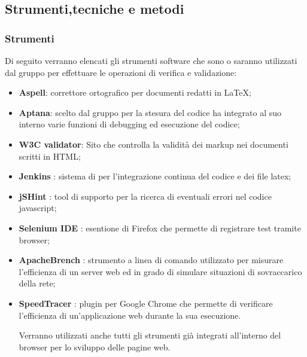 
\subsection{Strumenti,tecniche e metodi}

\subsubsection{Strumenti}
\label{sec:strumenti}
Di seguito verranno elencati gli strumenti software che sono o saranno utilizzati dal gruppo per effettuare le operazioni di verifica e validazione:
\begin{itemize}

\item \textbf{Aspell}: correttore ortografico per documenti redatti in \LaTeX;

\item \textbf{Aptana}: scelto dal gruppo per la stesura del codice ha integrato al suo interno varie funzioni di debugging ed esecuzione del codice;

\item \textbf{W3C validator}: Sito che controlla la validità dei markup nei documenti scritti in HTML;

\item \textbf{Jenkins} : sistema di per l'integrazione continua del codice e dei file latex;

\item \textbf{jSHint}  : tool di supporto per la ricerca di eventuali errori nel codice javascript;

\item \textbf{Selenium IDE} : esentione di Firefox che permette di registrare test tramite browser;

\item \textbf{ApacheBrench} : strumento a linea di comando utilizzato per misurare l’efficienza di un server web ed in grado di simulare situazioni di
sovraccarico della rete;

\item \textbf{SpeedTracer} : plugin per Google Chrome che permette di verificare l’efficienza di un’applicazione web durante la sua esecuzione.

Verranno utilizzati anche tutti gli strumenti già integrati all'interno del browser per lo sviluppo delle pagine web.

\end{itemize}
